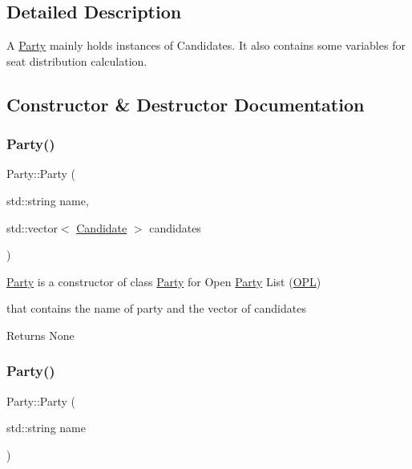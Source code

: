 \subsection{Detailed Description}
A \hyperlink{classParty}{Party} mainly holds instances of Candidates. It also contains some variables for seat distribution calculation. 

\subsection{Constructor \& Destructor Documentation}
\mbox{\label{classParty_aab26b5b8dfb95aed33e16938989dc0a5}} 
\subsubsection{\texorpdfstring{Party()}{Party()}\hspace{0.1cm}{\footnotesize\ttfamily [1/3]}}
{\footnotesize\ttfamily Party\+::\+Party (\begin{DoxyParamCaption}\item[{std\+::string}]{name,  }\item[{std\+::vector$<$ \hyperlink{classCandidate}{Candidate} $>$}]{candidates }\end{DoxyParamCaption})}



\hyperlink{classParty}{Party} is a constructor of class \hyperlink{classParty}{Party} for Open \hyperlink{classParty}{Party} List (\hyperlink{classOPL}{O\+PL}) 

that contains the name of party and the vector of candidates

\begin{DoxyReturn}{Returns}
None 
\end{DoxyReturn}
\mbox{\label{classParty_ab7eb172ab879241b8a3d55a6dfff2417}} 
\subsubsection{\texorpdfstring{Party()}{Party()}\hspace{0.1cm}{\footnotesize\ttfamily [2/3]}}
{\footnotesize\ttfamily Party\+::\+Party (\begin{DoxyParamCaption}\item[{std\+::string}]{name }\end{DoxyParamCaption})}



